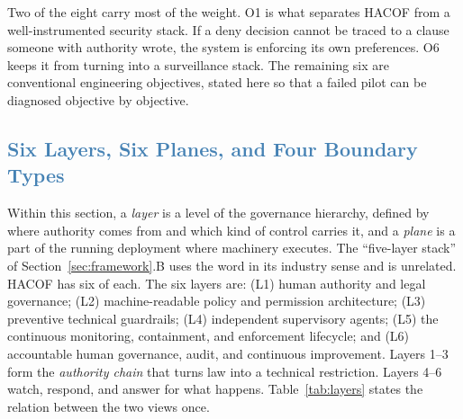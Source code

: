 \documentclass[journal]{IEEEtran}
\newcommand{\hacof}{HACOF}
\begin{document}
Two of the eight carry most of the weight. O1 is what separates \hacof{} from a well-instrumented security stack. If a deny decision cannot be traced to a clause someone with authority wrote, the system is enforcing its own preferences. O6 keeps it from turning into a surveillance stack. The remaining six are conventional engineering objectives, stated here so that a failed pilot can be diagnosed objective by objective.

\subsection{\textcolor{steelblue}{Six Layers, Six Planes, and Four Boundary Types}}
\label{sec:hacof-arch}

Within this section, a \textit{layer} is a level of the governance hierarchy, defined by where authority comes from and which kind of control carries it, and a \textit{plane} is a part of the running deployment where machinery executes. The ``five-layer stack'' of Section~\ref{sec:framework}.B uses the word in its industry sense and is unrelated. \hacof{} has six of each. The six layers are: (L1) human authority and legal governance; (L2) machine-readable policy and permission architecture; (L3) preventive technical guardrails; (L4) independent supervisory agents; (L5) the continuous monitoring, containment, and enforcement lifecycle; and (L6) accountable human governance, audit, and continuous improvement. Layers 1--3 form the \textit{authority chain} that turns law into a technical restriction. Layers 4--6 watch, respond, and answer for what happens. Table~\ref{tab:layers} states the relation between the two views once.
\end{document}
